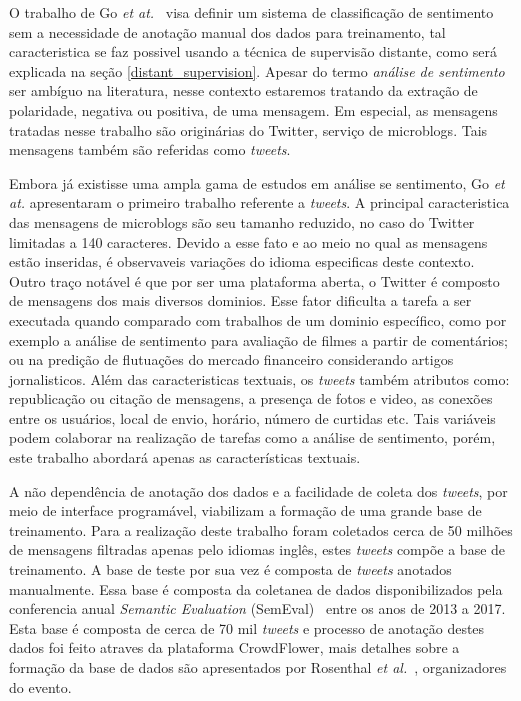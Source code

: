 O trabalho de Go \textit{et at.}~\cite{go09} visa definir um sistema de classificação de sentimento sem a necessidade
de anotação manual dos dados para treinamento, tal caracteristica se faz possivel usando a técnica de supervisão
distante, como será explicada na seção \ref{distant_supervision}.
Apesar do termo \textit{análise de sentimento} ser ambíguo na literatura, nesse contexto estaremos tratando da extração
de polaridade, negativa ou positiva, de uma mensagem.
Em especial, as mensagens tratadas nesse trabalho são originárias do Twitter, serviço de microblogs.
Tais mensagens também são referidas como \textit{tweets}.

Embora já existisse uma ampla gama de estudos em análise se sentimento, Go \textit{et at.} apresentaram o primeiro
trabalho referente a \textit{tweets}.
A principal caracteristica das mensagens de microblogs são seu tamanho reduzido, no caso do Twitter limitadas a
140 caracteres.
Devido a esse fato e ao meio no qual as mensagens estão inseridas, é observaveis variações do idioma especificas
deste contexto.
Outro traço notável é que por ser uma plataforma aberta, o Twitter é composto de mensagens dos mais diversos dominios.
Esse fator dificulta a tarefa a ser executada quando comparado com trabalhos de um dominio específico, como por exemplo
a análise de sentimento para avaliação de filmes a partir de comentários; ou na predição de flutuações do mercado
financeiro considerando artigos jornalisticos.
Além das caracteristicas textuais, os \textit{tweets} também atributos como: republicação ou citação de mensagens, a
presença de fotos e video, as conexões entre os usuários, local de envio, horário, número de curtidas etc. Tais variáveis
podem colaborar na realização de tarefas como a análise de sentimento, porém, este trabalho abordará apenas as
características textuais.

A não dependência de anotação dos dados e a facilidade de coleta dos \textit{tweets}, por meio de interface programável,
viabilizam a formação de uma grande base de treinamento.
Para a realização deste trabalho foram coletados cerca de 50 milhões de mensagens filtradas apenas pelo idiomas inglês,
estes \textit{tweets} compõe a base de treinamento.
A base de teste por sua vez é composta de \textit{tweets} anotados manualmente. Essa base é composta da coletanea de dados
disponibilizados pela conferencia anual \textit{Semantic Evaluation} (SemEval)~\cite{semeval17} entre os anos de 2013 a 2017.
Esta base é composta de cerca de 70 mil \textit{tweets} e processo de anotação destes dados foi feito atraves da plataforma
CrowdFlower, mais detalhes sobre a formação da base de dados são apresentados por Rosenthal \textit{et al.}~\cite{rosenthal17},
organizadores do evento.

